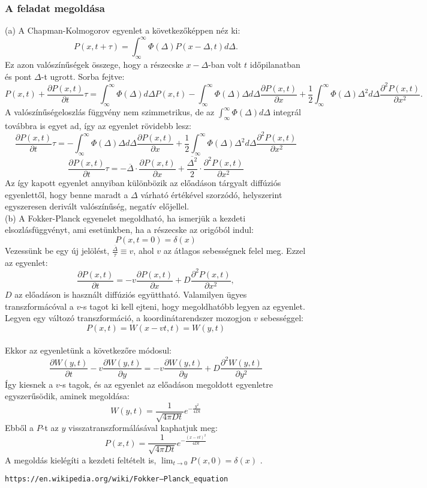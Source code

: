\documentclass[12pt]{article}
\begin{document}
\subsubsection*{A feladat megoldása}
(a) A Chapman-Kolmogorov egyenlet a következőképpen néz ki:
$$P(x,t+\tau) = \int_{\infty}^{\infty}\Phi(\Delta)P(x-\Delta, t)d\Delta.$$
Ez azon valószínűségek összege, hogy a részecske $x-\Delta$-ban volt $t$ időpilanatban és pont $\Delta$-t ugrott. Sorba fejtve:
$$P(x,t)+\frac{\partial P(x,t)}{\partial t}\tau =\int_{\infty}^{\infty}\Phi(\Delta)d\Delta P(x,t) -\int_{\infty}^{\infty}\Phi(\Delta)\Delta d\Delta\frac{\partial P(x,t)}{\partial x} + \frac{1}{2}\int_{\infty}^{\infty}\Phi(\Delta)\Delta^2d\Delta\frac{\partial^2P(x,t)}{\partial x^2}  .$$
A valószínűségeloszlás függvény nem szimmetrikus, de az $\int_{\infty}^{\infty}\Phi(\Delta)d\Delta$ integrál továbbra is egyet ad, így az egyenlet rövidebb lesz:
$$\frac{\partial P(x,t)}{\partial t}\tau = -\int_{\infty}^{\infty}\Phi(\Delta)\Delta d\Delta\frac{\partial P(x,t)}{\partial x} + \frac{1}{2}\int_{\infty}^{\infty}\Phi(\Delta)\Delta^2d\Delta\frac{\partial^2P(x,t)}{\partial x^2}$$
$$\frac{\partial P(x,t)}{\partial t}\tau = -\overline \Delta\cdot\frac{\partial P(x,t)}{\partial x} + \frac{\overline{\Delta ^2}}{2}\cdot\frac{\partial^2P(x,t)}{\partial x^2}$$
Az így kapott egyenlet annyiban különbözik az előadáson tárgyalt diffúziós egyenlettől, hogy benne maradt a $\Delta$ várható értékével szorzódó, helyszerint egyszeresen derivált valószínűség, negatív előjellel.\\
(b) A Fokker-Planck egyenelet megoldható, ha ismerjük a kezdeti elsozlásfüggvényt\cite{wik}, ami esetünkben, ha a részecske az origóból indul:
$$ P(x, t = 0) = \delta(x)$$
Vezessünk be egy új jelölést, $\frac{\overline{\Delta}}{\tau}\equiv v$, ahol $v$ az átlagos sebességnek felel meg. Ezzel az egyenlet:
$$ \frac{\partial P(x,t)}{\partial t} = -v\frac{\partial P(x,t)}{\partial x} + D\frac{\partial ^2 P(x,t)}{\partial x^2},$$
$D$ az előadáson is használt diffúziós együttható. Valamilyen ügyes transzformácóval a $v$-s tagot ki kell ejteni, hogy megoldhatóbb legyen az egyenlet. Legyen egy változó transzformáció, a koordinátarendszer mozogjon $v$ sebességgel:
$$P(x,t) = W(x-vt, t) = W(y, t)$$
\\Ekkor az egyenletünk a következőre módosul:
$$\frac{\partial W(y,t)}{\partial t}-v\frac{\partial W(y,t)}{\partial y} = -v\frac{\partial W(y,t)}{\partial y} + D\frac{\partial^2 W(y,t)}{\partial y^2}$$
Így kiesnek a $v$-s tagok, és az egyenlet az előadáson megoldott egyenletre egyszerűsödik, aminek megoldása:
$$W(y,t) = \frac{1}{\sqrt{4\pi Dt}}e^{-\frac{y^2}{4Dt}}$$
Ebből a $P$-t az $y$ visszatranszformálásával kaphatjuk meg:
$$P(x,t) =\frac{1}{\sqrt{4\pi Dt}}e^{-\frac{(x-vt)^2}{4Dt}} $$
A megoldás kielégíti a kezdeti feltételt is, $\lim_{t\to 0}P(x, 0) = \delta(x)$
.
\begin{thebibliography}{9}
\texttt{https://en.wikipedia.org/wiki/Fokker–Planck\_{}equation}

\end{thebibliography}
\end{document}
